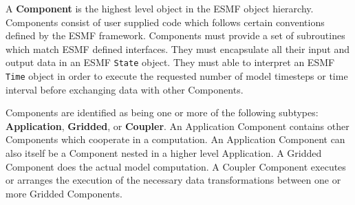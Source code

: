 %


A {\bf Component}
is the highest level object in the ESMF object
hierarchy.  Components consist of user supplied code
which follows certain conventions defined by the ESMF framework.
Components must provide a set of subroutines which match ESMF
defined interfaces. They must encapsulate
all their input and output data in an ESMF {\tt State} object.  They
must able to interpret an ESMF {\tt Time} object in order
to execute the requested number of model timesteps or time interval
before exchanging data with other Components.

Components are identified as being one or more of the
following subtypes: {\bf Application}, {\bf Gridded}, or {\bf Coupler}.
An Application Component contains other Components which
cooperate in a computation. An Application Component can also itself be a
Component nested in a higher level Application.  A Gridded Component
does the actual model computation.  A Coupler Component executes or
arranges the execution of the necessary data transformations between one
or more Gridded Components.


